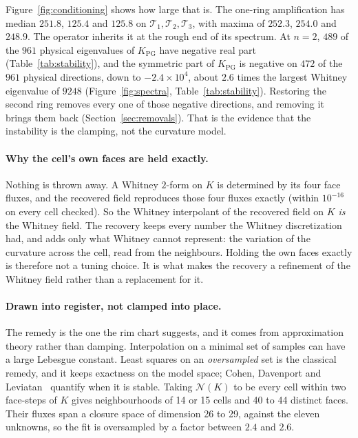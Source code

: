 \documentclass[11pt]{article}
\theoremstyle{definition}
\theoremstyle{remark}
\newcommand{\T}{\mathcal{T}}
\begin{document}
Figure~\ref{fig:conditioning} shows how large that is. The one-ring amplification has
median $251.8$, $125.4$ and $125.8$ on $\T_1,\T_2,\T_3$,
with maxima of $252.3$, $254.0$ and $248.9$. The
operator inherits it at the rough end of its spectrum. At $n=2$, $489$ of the $961$ physical
eigenvalues of $K_{\mathrm{PG}}$ have negative real part (Table~\ref{tab:stability}), and the
symmetric part of $K_{\mathrm{PG}}$ is negative on $472$ of the $961$ physical directions, down to
$-2.4\times10^{4}$, about $2.6$ times the largest Whitney eigenvalue of $9248$
(Figure~\ref{fig:spectra}, Table~\ref{tab:stability}). Restoring the second ring removes
every one of those negative directions, and removing it brings them back
(Section~\ref{sec:removals}). That is the evidence that the instability is the
clamping, not the curvature model.

\paragraph{Why the cell's own faces are held exactly.} Nothing is thrown away. A
Whitney $2$-form on $K$ is determined by its four face fluxes, and the recovered field
reproduces those four fluxes exactly (within $10^{-16}$ on every cell checked). So the Whitney
interpolant of the recovered field on $K$ \emph{is} the Whitney field. The recovery
keeps every number the Whitney discretization had, and adds only what Whitney cannot
represent: the variation of the curvature across the cell, read from the neighbours.
Holding the own faces exactly is therefore not a tuning choice. It is what makes the
recovery a refinement of the Whitney field rather than a replacement for it.

\paragraph{Drawn into register, not clamped into place.} The remedy is the one the
rim chart suggests, and it comes from approximation theory rather than damping.
Interpolation on a minimal set of samples can have a large Lebesgue constant. Least
squares on an \emph{oversampled} set is the classical remedy, and it keeps exactness
on the model space; Cohen, Davenport and Leviatan~\cite{cdl2013} quantify when it is
stable. Taking $\mathcal{N}(K)$ to be every cell within two face-steps of $K$ gives
neighbourhoods of 14 or 15 cells and 40 to 44
distinct faces. Their fluxes span a closure space of dimension 26 to 29,
against the eleven unknowns, so the fit is oversampled by a factor between
$2.4$ and $2.6$.
\end{document}
